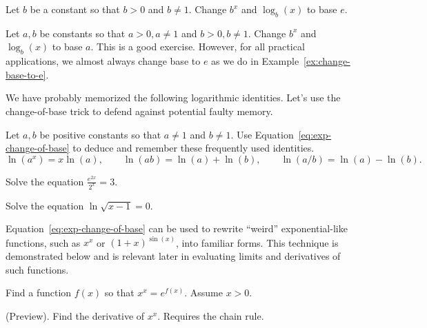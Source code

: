 \documentclass[../main.tex]{subfiles}
\begin{document}
  \begin{example} \label{ex:change-base-to-e}
    Let \(b\) be a constant so that \(b > 0\) and \(b \ne 1\).  Change \(b^{x}\) and \(\log_{b}(x)\) to base \(e\). 

  \end{example}
  \clearpage


  \begin{example}
    Let \(a,b\) be constants so that \(a > 0, a \ne 1\) and \(b > 0, b \ne 1\).  
    Change \(b^{x}\) and \(\log_{b}(x)\) to base \(a\). \newline
    \faExclamationTriangle{} This is a good exercise. However, for all practical applications, we almost always change base to \(e\) as we do in Example~\ref{ex:change-base-to-e}.

  \end{example}


  We have probably memorized the following logarithmic identities. Let's use the change-of-base trick to defend against potential faulty memory.

  \begin{example}
    Let \(a,b\) be positive constants so that \(a \ne 1\) and \(b \ne 1\). Use Equation~\eqref{eq:exp-change-of-base} to deduce and remember these frequently used identities.
    \[
      \ln(a^{x}) = x \ln(a),
      \qquad
      \ln(ab) = \ln(a) + \ln(b),
      \qquad
      \ln(a/b) = \ln(a) - \ln(b).
    \]
  \end{example}
  \clearpage

  \begin{example}
    Solve the equation \(\frac{e^{2x}}{2^{x}} = 3\).

  \end{example}

  \begin{example}
    Solve the equation \(\ln \sqrt{x - 1} = 0\). 
  \end{example}

  \faStar{} Equation~\eqref{eq:exp-change-of-base} can be used to rewrite ``weird'' exponential-like functions, such as \(x^{x}\) or \((1+x)^{\sin(x)}\), into familiar forms. This technique is demonstrated below and is relevant later in evaluating limits and derivatives of such functions.

  \begin{example} \label{ex:x-to-x}
    Find a function \(f(x)\) so that \(x^{x} = e^{f(x)}\). Assume \(x > 0\). \newline

    (Preview). Find the derivative of \(x^{x}\). Requires the chain rule.
  \end{example}
  \clearpage
\end{document}
